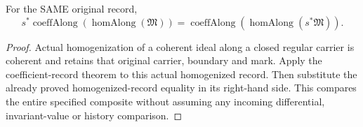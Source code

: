 \begin{theorem}
\label{hir:actual-zero-section-submanifold-whole-coefficient-homogenized}
\leanok
For the SAME original record,
\[
 s^*\operatorname{coeffAlong}(\operatorname{homAlong}(\mathfrak M))=
 \operatorname{coeffAlong}(\operatorname{homAlong}(s^*\mathfrak M)).
\]
\end{theorem}
\begin{proof}
Actual homogenization of a coherent ideal along a closed regular carrier is coherent and retains that original carrier, boundary and mark. Apply the coefficient-record theorem to this actual homogenized record. Then substitute the already proved homogenized-record equality in its right-hand side. This compares the entire specified composite without assuming any incoming differential, invariant-value or history comparison.
\end{proof}
